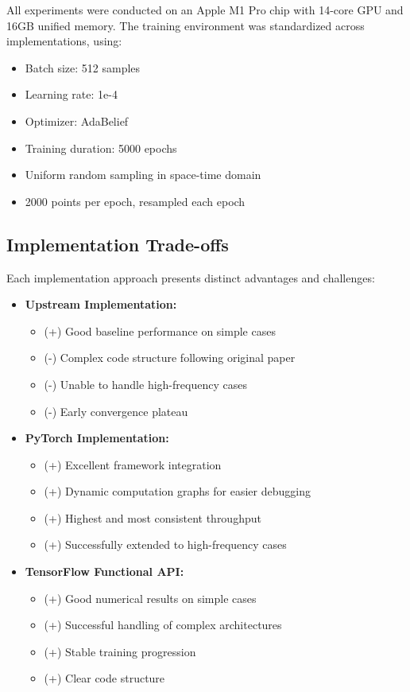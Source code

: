 \documentclass[10pt,journal,compsoc,onecolumn]{IEEEtran}
\begin{document}
All experiments were conducted on an Apple M1 Pro chip with 14-core GPU and 16GB unified memory. The training environment was standardized across implementations, using:
\begin{itemize}
    \item Batch size: 512 samples
    \item Learning rate: 1e-4
    \item Optimizer: AdaBelief
    \item Training duration: 5000 epochs
    \item Uniform random sampling in space-time domain
    \item 2000 points per epoch, resampled each epoch
\end{itemize}

\subsection{Implementation Trade-offs}
Each implementation approach presents distinct advantages and challenges:

\begin{itemize}
    \item \textbf{Upstream Implementation:}
    \begin{itemize}
        \item (+) Good baseline performance on simple cases
        \item (-) Complex code structure following original paper
        \item (-) Unable to handle high-frequency cases
        \item (-) Early convergence plateau
    \end{itemize}
    
    \item \textbf{PyTorch Implementation:}
    \begin{itemize}
        \item (+) Excellent framework integration
        \item (+) Dynamic computation graphs for easier debugging
        \item (+) Highest and most consistent throughput
        \item (+) Successfully extended to high-frequency cases
    \end{itemize}
    
    \item \textbf{TensorFlow Functional API:}
    \begin{itemize}
        \item (+) Good numerical results on simple cases
        \item (+) Successful handling of complex architectures
        \item (+) Stable training progression
        \item (+) Clear code structure
    \end{itemize}
\end{itemize}
\end{document}
